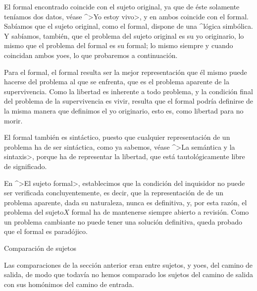 El {\sujeto} formal encontrado coincide con el sujeto original, ya que
de éste solamente teníamos dos datos, véase ^>Yo estoy vivo>, y en ambos
coincide con el formal. Sabíamos que el sujeto original, como el
{\sujeto} formal, dispone de una ^{lógica simbólica}. Y sabíamos,
también, que el problema del sujeto original es su yo originario, lo
mismo que el problema del {\sujeto} formal es su {\yo} formal; lo mismo
siempre y cuando coincidan ambos yoes, lo que probaremos a continuación.

Para el {\sujeto} formal, el {\yo} formal resulta ser la mejor
representación que él mismo puede hacerse del problema al que se
enfrenta, que es el problema aparente de la supervivencia. Como la
libertad es inherente a todo problema, y la condición final del problema
de la supervivencia es vivir, resulta que el {\yo} formal podría
definirse de la misma manera que definimos el yo originario, esto es,
como libertad para no morir.

El {\yo} formal también es sintáctico, puesto que cualquier
representación de un problema ha de ser sintáctica, como ya sabemos,
véase ^>La semántica y la sintaxis>, porque ha de representar la
libertad, que está tautológicamente libre de significado.

En ^>El sujeto formal>, establecimos que la condición del inquisidor no
puede ser verificada concluyentemente, es decir, que la representación
de de un problema aparente, dada su naturaleza, nunca es definitiva, y,
por esta razón, el \Mental problema del sujeto$X$ formal ha de
mantenerse siempre abierto a revisión. Como un problema cambiante no
puede tener una solución definitiva, queda probado que el {\yo} formal
es paradójico.


\Section Comparación de sujetos

Las comparaciones de la sección anterior eran entre sujetos, y yoes, del
camino de salida, de modo que todavía no hemos comparado los sujetos del
camino de salida con sus homónimos del camino de entrada.

